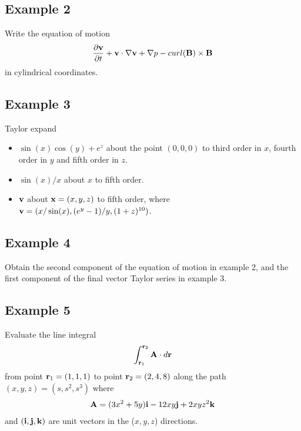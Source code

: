 \subsection{Example 2}

Write the equation of motion
\begin{eqnarray*}
\frac{\partial {\bf v}}{\partial t} + {\bf v} \cdot {\bf \nabla v} 
+ {\bf \nabla} p - curl ({\bf B}) \times {\bf B}
\end{eqnarray*}
in cylindrical coordinates.

\subsection{Example 3}

Taylor expand
\begin{itemize}
\item $\sin(x) \cos(y) +e^z$
about the point $(0,0,0)$ to third order in $x$, fourth order in $y$ and
fifth order in $z$.

\item $\sin(x)/x$ about $x$ to fifth order.

\item ${\bf v}$ about ${\bf x}=(x,y,z)$ to fifth order, where
${\bf v} = (x/ \sin(x),(e^y-1)/y,(1+z)^{10})$.
\end{itemize}

\subsection{Example 4}
Obtain the second component of the equation of motion in example 2, and 
the first 
component of the final vector Taylor series in example 3.

\subsection{Example 5}

Evaluate the line integral 
\begin{eqnarray*}
\int^{{\bf r}_2}_{{\bf r}_1} {\bf A} \cdot d{\bf r}
\end{eqnarray*}
from point ${\bf r}_1 = (1,1,1)$ to point
${\bf r}_2 = (2,4,8)$ along the path $(x,y,z) = (s, s^2, s^3)$ where\\
\begin{eqnarray*}
{\bf A} = (3x^2 + 5y) {\bf i} - 12xy{\bf j} + 2xyz^2{\bf k}
\end{eqnarray*}
and $({\bf i, j, k})$ are unit vectors in the ($x,y,z$) directions.

